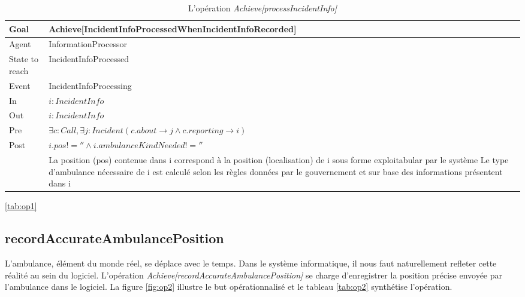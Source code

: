 	\begin{table}[!h] \centering
		\begin{tabularx}{\textwidth}{|l|X|} \hline
			Goal & Achieve[IncidentInfoProcessedWhenIncidentInfoRecorded] \\ \hline
			Agent & InformationProcessor \\ \hline
			State to reach & IncidentInfoProcessed \\ \hline
			Event & IncidentInfoProcessing \\ \hline
			In & $i: IncidentInfo$ \\ \hline
			Out & $i: IncidentInfo$ \\ \hline
			Pre & $\exists c: Call, \exists j: Incident (c.about \rightarrow j \wedge c.reporting \rightarrow i)$ \\ \hline
			Post & $i.pos != '' \wedge i.ambulanceKindNeeded != ''$  \\
				 & La position (pos) contenue dans i correspond à la position (localisation) de i sous forme exploitabular par le système 
				  Le type d'ambulance nécessaire de i est calculé selon les règles données par le gouvernement et sur base des 
				  informations présentent dans i \\ \hline
		\end{tabularx}
		\caption{L'opération \textit{Achieve[processIncidentInfo]}}\ref{tab:op1}
	\end{table}

\subsection{recordAccurateAmbulancePosition}
	
	L'ambulance, élément du monde réel, se déplace avec le temps. Dans le système
	informatique, il nous faut naturellement refleter cette réalité au 
	sein du logiciel. L'opération \textit{Achieve[recordAccurateAmbulancePosition]}
	se charge d'enregistrer la position précise envoyée par l'ambulance
	dans le logiciel. La figure \ref{fig:op2} illustre
	le but opérationnalisé et le tableau \ref{tab:op2} synthétise l'opération.
	
	
